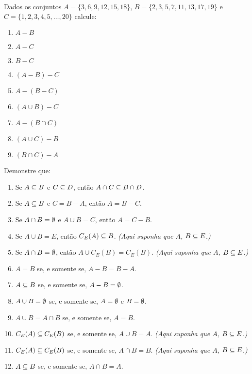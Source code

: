 \documentclass[12pt]{exam}
\begin{document}
\vspace{.3cm}

\questao{} Dados os conjuntos $A = \{3,6,9,12,15,18\}$, $B = \{2,3,5,7,11,13,17,19\}$ e $C = \{1,2,3,4,5,\dots,20\}$ calcule:
\begin{multicols}{3}
	\begin{enumerate}[label={\alph*})]
		\item $A - B$
		\item $A - C$
		\item $B - C$
		\item $(A - B) - C$
		\item $A - (B - C)$
		\item $(A \cup B) - C$
		\item $A - (B \cap C)$
		\item $(A \cup C) - B$
		\item $(B \cap C) - A$
	\end{enumerate}
\end{multicols}

\vspace{.3cm}

\questao{} Demonstre que:
\begin{enumerate}[label={\alph*})]
\item Se $A \subseteq B$ e $C \subseteq D$, ent\~ao $A \cap C \subseteq B \cap D$.

\item Se $A \subseteq B$ e $C = B - A$, ent\~ao $A = B - C$.

\item Se $A \cap B = \emptyset$ e $A \cup B = C$, ent\~ao $A = C - B$.

\item Se $A\cup B = E$, ent\~ao $C_E(A) \subseteq B$. \textit{(Aqui suponha que $A$, $B \subseteq E$.)}

\item Se $A \cap B = \emptyset$, ent\~ao $A \cup C_E(B) = C_E(B)$. \textit{(Aqui suponha que $A$, $B \subseteq E$.)}
  
\item $A = B$ se, e somente se, $A - B = B - A$.

\item $A \subseteq B$ se, e somente se, $A - B = \emptyset$.

\item $A \cup B = \emptyset$ se, e somente se, $A = \emptyset$ e $B = \emptyset$.

\item $A \cup B = A \cap B$ se, e somente se,  $A = B$.

\item $C_E(A) \subseteq C_E(B)$ se, e somente se, $A \cup B = A$. \textit{(Aqui suponha que $A$, $B \subseteq E$.)}

\item $C_E(A) \subseteq C_E(B)$ se, e somente se, $A \cap B = B$. \textit{(Aqui suponha que $A$, $B \subseteq E$.)}

\item $A \subseteq B$ se, e somente se,  $A \cap B = A$.
\end{enumerate}
\end{document}
